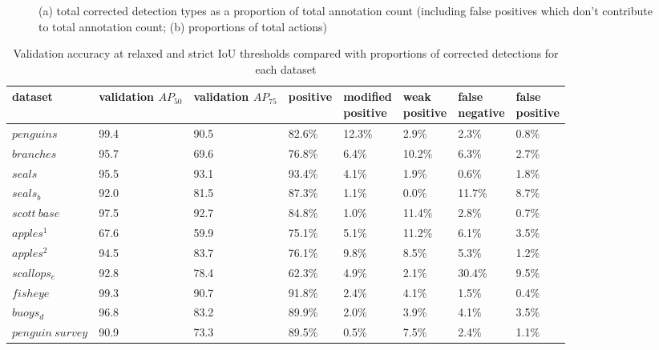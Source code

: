 \begin{figure}[H]
\caption {(a) total corrected detection types as a proportion of total annotation count (including false positives which don't contribute to total annotation count; (b) proportions of total actions)}
\label{fig:actions_dataset}
\end{figure}

\begin{table}[h!]
\caption{Validation accuracy at relaxed and strict IoU thresholds compared with proportions of corrected detections for each dataset}
\label{tabl:validation_corrections}
\begin{tabular}{llllllll}
dataset           & \shortstack{validation \\ $AP_{50}$} & \shortstack{validation  \\ $AP_{75}$} & positive & \shortstack{modified\\ positive} & \shortstack{weak\\ positive} & \shortstack{false \\ negative} & \shortstack{false \\ positive} \\
\toprule
$penguins$        & 99.4      & 90.5      & 82.6\%   & 12.3\%            & 2.9\%         & 2.3\%          & 0.8\%          \\
$branches$        & 95.7      & 69.6      & 76.8\%   & 6.4\%             & 10.2\%        & 6.3\%          & 2.7\%          \\
$seals$           & 95.5      & 93.1      & 93.4\%   & 4.1\%             & 1.9\%         & 0.6\%          & 1.8\%          \\
$seals_b$         & 92.0      & 81.5      & 87.3\%   & 1.1\%             & 0.0\%         & 11.7\%         & 8.7\%          \\
$scott\:base$     & 97.5      & 92.7      & 84.8\%   & 1.0\%             & 11.4\%        & 2.8\%          & 0.7\%          \\
$apples^1$        & 67.6      & 59.9      & 75.1\%   & 5.1\%             & 11.2\%        & 6.1\%          & 3.5\%          \\
$apples^2$        & 94.5      & 83.7      & 76.1\%   & 9.8\%             & 8.5\%         & 5.3\%          & 1.2\%          \\
$scallops_e$      & 92.8      & 78.4      & 62.3\%   & 4.9\%             & 2.1\%         & 30.4\%         & 9.5\%          \\
$fisheye$         & 99.3      & 90.7      & 91.8\%   & 2.4\%             & 4.1\%         & 1.5\%          & 0.4\%          \\
$buoys_d$         & 96.8      & 83.2      & 89.9\%   & 2.0\%             & 3.9\%         & 4.1\%          & 3.5\%          \\
$penguin\:survey$ & 90.9      & 73.3      & 89.5\%   & 0.5\%             & 7.5\%         & 2.4\%          & 1.1\%        \\
\bottomrule
\end{tabular}
\end{table}



